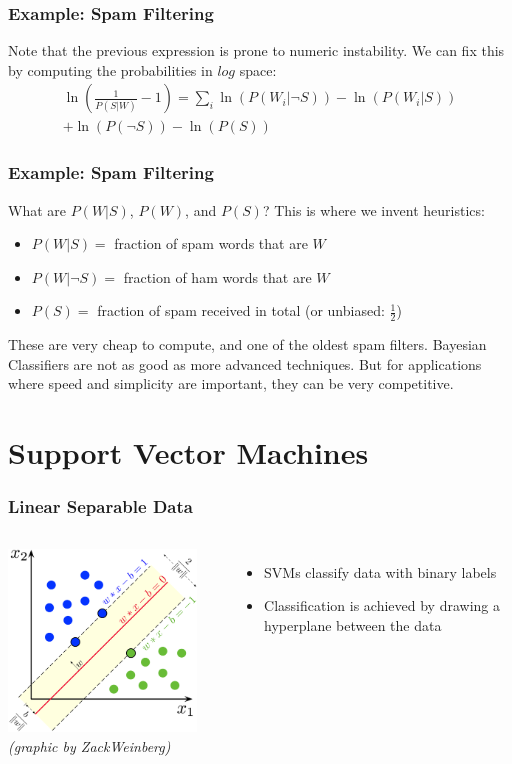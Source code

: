 \documentclass[mathserif,serif]{beamer}
\begin{document}
\begin{frame}
  \frametitle{Example: Spam Filtering}
  Note that the previous expression is prone to numeric instability. We can fix this by computing
  the probabilities in $log$ space:
  \begin{equation}
  \begin{split}
    \ln\left( \frac{1}{P(S|W)} - 1 \right) = \sum_i \ln\left( P(W_i|\neg S) \right) - \ln\left( P(W_i|S) \right) \\
      + \ln(P(\neg S)) - \ln(P(S))
  \end{split}
  \end{equation}
\end{frame}

\begin{frame}
  \frametitle{Example: Spam Filtering}
  What are $P(W|S)$, $P(W)$, and $P(S)$? \pause This is where we invent heuristics:
  \begin{itemize}
    \item $P(W|S) = $ fraction of spam words that are $W$
    \item $P(W|\neg S) = $ fraction of ham words that are $W$
    \item $P(S) = $ fraction of spam received in total (or unbiased: $\frac12$)
  \end{itemize}
  \pause
  These are very cheap to compute, and one of the oldest spam filters. Bayesian Classifiers are not
  as good as more advanced techniques. But for applications where speed and simplicity are important,
  they can be very competitive.
\end{frame}

\section{Support Vector Machines}
\frame{\sectionpage}

\begin{frame}
  \frametitle{Linear Separable Data}
  \begin{columns}
    \centering
    \includegraphics[width=5cm]{svm}
    \textit{\tiny(graphic by ZackWeinberg)}

    \begin{itemize}
      \item SVMs classify data with binary labels
      \item Classification is achieved by drawing a hyperplane between the data
    \end{itemize}
  \end{columns}
\end{frame}
\end{document}
